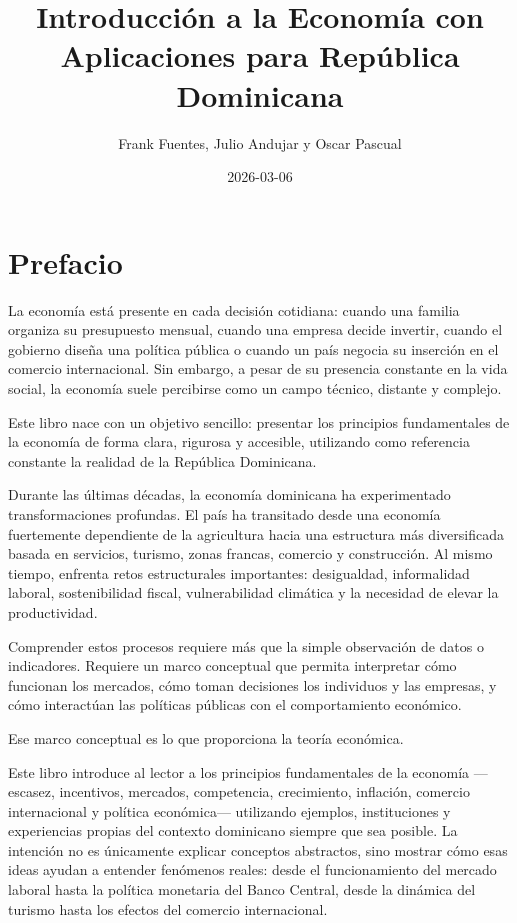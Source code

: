 \documentclass[
  letterpaper,
  DIV=11,
  numbers=noendperiod,
  oneside]{scrreprt}
\title{Introducción a la Economía con Aplicaciones para República
Dominicana}
\author{Frank Fuentes, Julio Andujar y Oscar Pascual}
\date{2026-03-06}
\renewcommand*\contentsname{Tabla de contenidos}
\newcommand\contentsname{Tabla de contenidos}
\begin{document}
\maketitle

\renewcommand*\contentsname{Tabla de contenidos}
{
\hypersetup{linkcolor=}
\setcounter{tocdepth}{2}
\tableofcontents
}


\chapter*{Prefacio}\label{prefacio}


La economía está presente en cada decisión cotidiana: cuando una familia
organiza su presupuesto mensual, cuando una empresa decide invertir,
cuando el gobierno diseña una política pública o cuando un país negocia
su inserción en el comercio internacional. Sin embargo, a pesar de su
presencia constante en la vida social, la economía suele percibirse como
un campo técnico, distante y complejo.

Este libro nace con un objetivo sencillo: presentar los principios
fundamentales de la economía de forma clara, rigurosa y accesible,
utilizando como referencia constante la realidad de la República
Dominicana.

Durante las últimas décadas, la economía dominicana ha experimentado
transformaciones profundas. El país ha transitado desde una economía
fuertemente dependiente de la agricultura hacia una estructura más
diversificada basada en servicios, turismo, zonas francas, comercio y
construcción. Al mismo tiempo, enfrenta retos estructurales importantes:
desigualdad, informalidad laboral, sostenibilidad fiscal, vulnerabilidad
climática y la necesidad de elevar la productividad.

Comprender estos procesos requiere más que la simple observación de
datos o indicadores. Requiere un marco conceptual que permita
interpretar cómo funcionan los mercados, cómo toman decisiones los
individuos y las empresas, y cómo interactúan las políticas públicas con
el comportamiento económico.

Ese marco conceptual es lo que proporciona la teoría económica.

Este libro introduce al lector a los principios fundamentales de la
economía ---escasez, incentivos, mercados, competencia, crecimiento,
inflación, comercio internacional y política económica--- utilizando
ejemplos, instituciones y experiencias propias del contexto dominicano
siempre que sea posible. La intención no es únicamente explicar
conceptos abstractos, sino mostrar cómo esas ideas ayudan a entender
fenómenos reales: desde el funcionamiento del mercado laboral hasta la
política monetaria del Banco Central, desde la dinámica del turismo
hasta los efectos del comercio internacional.
\end{document}
